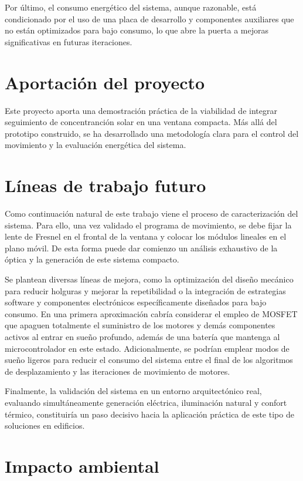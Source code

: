 Por último, el consumo energético del sistema, aunque razonable, está condicionado por el uso de una placa de desarrollo y componentes auxiliares que no están optimizados para bajo consumo, lo que abre la puerta a mejoras significativas en futuras iteraciones.

\section{Aportación del proyecto}

Este proyecto aporta una demostración práctica de la viabilidad de integrar seguimiento de concentranción solar en una ventana compacta. Más allá del prototipo construido, se ha desarrollado una metodología clara para el control del movimiento y la evaluación energética del sistema.

\section{Líneas de trabajo futuro}

Como continuación natural de este trabajo viene el proceso de caracterización del sistema. Para ello, una vez validado el programa de movimiento, se debe fijar la lente de Fresnel en el frontal de la ventana y colocar los módulos lineales en el plano móvil. De esta forma puede dar comienzo un análisis exhaustivo de la óptica y la generación de este sistema compacto.

Se plantean diversas líneas de mejora, como la optimización del diseño mecánico para reducir holguras y mejorar la repetibilidad o la integración de estrategias software y componentes electrónicos específicamente diseñados para bajo consumo. En una primera aproximación cabría considerar el empleo de MOSFET que apaguen totalmente el suministro de los motores y demás componentes activos al entrar en sueño profundo, además de una batería que mantenga al microcontrolador en este estado. Adicionalmente, se podrían emplear modos de sueño ligeros para reducir el consumo del sistema entre el final de los algoritmos de desplazamiento y las iteraciones de movimiento de motores.   

Finalmente, la validación del sistema en un entorno arquitectónico real, evaluando simultáneamente generación eléctrica, iluminación natural y confort térmico, constituiría un paso decisivo hacia la aplicación práctica de este tipo de soluciones en edificios.

\section{Impacto ambiental}

